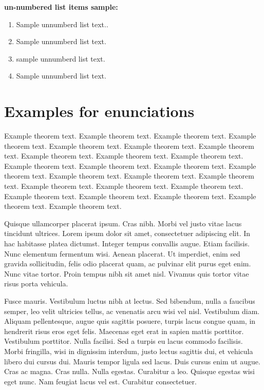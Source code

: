\documentclass[AMS,STIX2COL]{WileyNJD-v2}
\begin{document}
    \noindent\textbf{un-numbered list items sample:}

    \begin{enumerate}[]
        \item Sample unnumberd list text..
        \item Sample unnumberd list text.
        \item sample unnumberd list text.
        \item Sample unnumberd list text.
    \end{enumerate}


    \section{Examples for enunciations}\label{sec4}

    \begin{theorem}
        \label{thm1}
        Example theorem text. Example theorem text. Example theorem text. Example theorem text. Example theorem text. Example theorem text. Example theorem text. Example theorem text. Example theorem text. Example theorem text. Example theorem text. Example theorem text. Example theorem text. Example theorem text. Example theorem text. Example theorem text. Example theorem text. Example theorem text. Example theorem text. Example theorem text. Example theorem text. Example theorem text. Example theorem text. Example theorem text. Example theorem text.
    \end{theorem}

    Quisque ullamcorper placerat ipsum. Cras nibh. Morbi vel justo vitae lacus tincidunt ultrices. Lorem ipsum dolor sit
    amet, consectetuer adipiscing elit. In hac habitasse platea dictumst. Integer tempus convallis augue. Etiam facilisis.
    Nunc elementum fermentum wisi. Aenean placerat. Ut imperdiet, enim sed gravida sollicitudin, felis odio placerat
    quam, ac pulvinar elit purus eget enim. Nunc vitae tortor. Proin tempus nibh sit amet nisl. Vivamus quis tortor
    vitae risus porta vehicula.

    Fusce mauris. Vestibulum luctus nibh at lectus. Sed bibendum, nulla a faucibus semper, leo velit ultricies tellus, ac
    venenatis arcu wisi vel nisl. Vestibulum diam. Aliquam pellentesque, augue quis sagittis posuere, turpis lacus congue
    quam, in hendrerit risus eros eget felis. Maecenas eget erat in sapien mattis porttitor. Vestibulum porttitor. Nulla
    facilisi. Sed a turpis eu lacus commodo facilisis. Morbi fringilla, wisi in dignissim interdum, justo lectus sagittis dui, et
    vehicula libero dui cursus dui. Mauris tempor ligula sed lacus. Duis cursus enim ut augue. Cras ac magna. Cras nulla.
    Nulla egestas. Curabitur a leo. Quisque egestas wisi eget nunc. Nam feugiat lacus vel est. Curabitur consectetuer.
\end{document}
